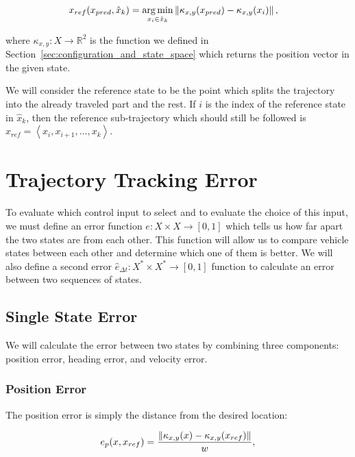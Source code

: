 \begin{equation}
\begin{aligned}
x_{ref}(x_{pred}, \hat{x}_k)&=\operatorname*{arg\,min}_{x_i \in \hat{x}_k} \left\lVert\kappa_{x,y}(x_{pred})-\kappa_{x,y}(x_i)\right\rVert,
\end{aligned}
\end{equation}
	
where $\kappa_{x,y}: X\rightarrow \mathbb{R}^2$ is the function we defined in Section~\ref{sec:configuration_and_state_space} which returns the position vector in the given state.

We will consider the reference state to be the point which splits the trajectory into the already traveled part and the rest. If $i$ is the index of the reference state in $\hat{x}_k$, then the reference sub-trajectory which should still be followed is $\hat{x}_{ref}=\left\langle x_i, x_{i+1}, \ldots, x_k \right\rangle$.

\section{Trajectory Tracking Error}
\label{sec:trajectory-tracking-error}

To evaluate which control input to select and to evaluate the choice of this input, we must define an error function $e: X\times X\rightarrow \left[0, 1\right]$ which tells us how far apart the two states are from each other. This function will allow us to compare vehicle states between each other and determine which one of them is better. We will also define a second error $\hat{e}_{\Delta t}: X^*\times X^*\rightarrow \left[0, 1\right]$ function to calculate an error between two sequences of states.

\subsection{Single State Error}

We will calculate the error between two states by combining three components: position error, heading error, and velocity error.

\subsubsection{Position Error}

The position error is simply the distance from the desired location:

\begin{equation}
	\label{eq:position_error}
	e_p(x, x_{ref})=\dfrac{\left\lVert\kappa_{x,y}(x)-\kappa_{x,y}(x_{ref})\right\rVert}{w},
\end{equation}

